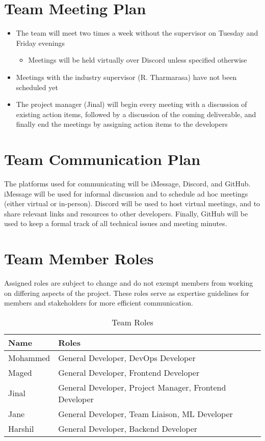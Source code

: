 \documentclass[12pt, titlepage]{article}
\begin{document}
\section{Team Meeting Plan}
\begin{itemize}
\item The team will meet two times a week without the supervisor on Tuesday and Friday evenings
\begin{itemize}
\item Meetings will be held virtually over Discord unless specified otherwise
\end{itemize}
\item Meetings with the industry supervisor (R. Tharmarasa) have not been scheduled yet
\item The project manager (Jinal) will begin every meeting with a discussion of existing action items,
followed by a discussion of the coming deliverable, and finally end the meetings by assigning
action items to the developers
\end{itemize}

\section{Team Communication Plan}
The platforms used for communicating will be iMessage, Discord, and GitHub. iMessage will be
used for informal discussion and to schedule ad hoc meetings (either virtual or in-person).
Discord will be used to host virtual meetings, and to share relevant links and resources to other
developers. Finally, GitHub will be used to keep a formal track of all technical issues and
meeting minutes.

\section{Team Member Roles}
Assigned roles are subject to change and do not exempt members from working on differing
aspects of the project. These roles serve as expertise guidelines for members and stakeholders
for more efficient communication.

\begin{table}[H]
\caption{Team Roles}
\label{tab:team-roles}
\begin{tabular}{|l|l|}
\hline
\textbf{Name} & \textbf{Roles} \\ \hline
Mohammed & General Developer, DevOps Developer \\ \hline
Maged & General Developer, Frontend Developer \\ \hline
Jinal & General Developer, Project Manager, Frontend Developer \\ \hline
Jane & General Developer, Team Liaison, ML Developer \\ \hline
Harshil & General Developer, Backend Developer \\ \hline
\end{tabular}
\end{table}
\end{document}

